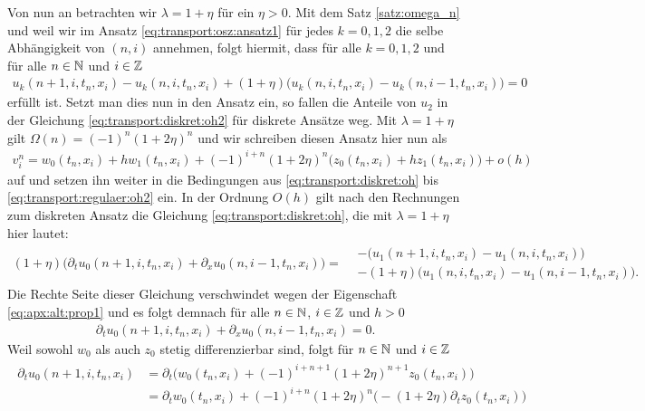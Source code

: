 Von nun an betrachten wir $\lambda = 1 + \eta$ für ein $\eta > 0$.
Mit dem Satz \ref{satz:omega_n} und weil wir im Ansatz \eqref{eq:transport:osz:ansatz1} für jedes $k = 0,1,2$ die selbe Abhängigkeit von $(n,i)$ annehmen, folgt hiermit, dass für alle $k = 0,1,2$ und für alle $n \in \mathbb N$ und $i \in \mathbb Z$
\begin{align}\label{eq:apx:alt:prop1}
u_k(n+1, i, t_n, x_i) - u_k(n, i, t_n, x_i) + (1 + \eta)\bigl(u_k(n, i, t_n, x_i) - u_k(n, i-1, t_n, x_i) \bigr) = 0
\end{align}
erfüllt ist.
Setzt man dies nun in den Ansatz ein, so fallen die Anteile von $u_2$ in der Gleichung \eqref{eq:transport:diskret:oh2} für diskrete Ansätze weg.
Mit $\lambda = 1 + \eta$ gilt $\Omega(n) = (-1)^n (1 + 2 \eta)^n$ und wir schreiben diesen Ansatz hier nun als
\begin{align}\label{eq:transport:osz:ansatz}
v^n_i = w_0(t_n, x_i) + h  w_1(t_n, x_i) + (-1)^{i+n} (1 + 2 \eta)^n \bigl( z_0(t_n, x_i) + h z_1(t_n, x_i) \bigr) + o(h)
\end{align}
auf und setzen ihn weiter in die Bedingungen aus \eqref{eq:transport:diskret:oh} bis \eqref{eq:transport:regulaer:oh2} ein.
In der Ordnung $O(h)$ gilt nach den Rechnungen zum diskreten Ansatz die Gleichung \eqref{eq:transport:diskret:oh}, die mit $\lambda = 1 + \eta$ hier lautet:
{\small \begin{align*}
(1 + \eta) \bigl( \partial_t u_0(n+1, i, t_n, x_i) + \partial_x u_0(n, i-1, t_n, x_i) \bigr) =
\begin{split}
&- \bigl( u_1(n+1, i, t_n, x_i) - u_1(n, i, t_n, x_i) \bigr)\\
&- (1 + \eta) \bigl(u_1(n, i, t_n, x_i) - u_1(n, i-1, t_n, x_i) \bigr).
\end{split}
\end{align*} }
Die Rechte Seite dieser Gleichung verschwindet wegen der Eigenschaft \eqref{eq:apx:alt:prop1} und es folgt demnach für alle $n \in \mathbb N$, $i \in \mathbb Z$ und $h > 0$
\begin{align*}
\partial_t u_0(n+1, i, t_n, x_i) + \partial_x u_0(n, i-1, t_n, x_i) = 0.
\end{align*}
Weil sowohl $w_0$ als auch $z_0$ stetig differenzierbar sind, folgt für $n \in \mathbb N$ und $i \in \mathbb Z$
\begin{align}
\begin{split}
\partial_t u_0(n+1, i, t_n, x_i) &= \partial_t \bigl( w_0(t_n, x_i) + (-1)^{i+n+1} (1 + 2\eta)^{n+1} z_0(t_n, x_i) \bigr)\\
&= \partial_t w_0(t_n, x_i) + (-1)^{i+n} (1 + 2\eta)^n \bigl( - (1 + 2 \eta) \partial_t z_0(t_n, x_i) \bigr)
\end{split}
\end{align}
